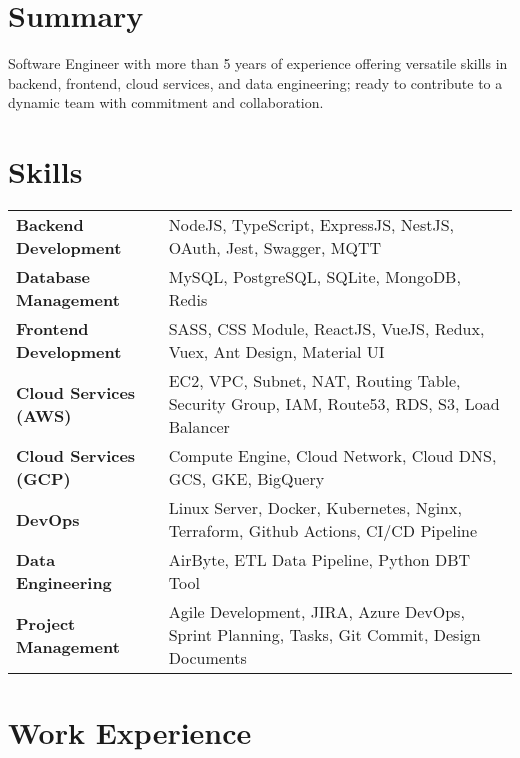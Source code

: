 \documentclass {article}
\begin{document}

\section{Summary}
Software Engineer with more than 5 years of experience offering versatile skills in backend, frontend, cloud services, and data engineering; ready to contribute to a dynamic team with commitment and collaboration.

\section{Skills}
\begin{tabularx}{\linewidth}{@{}l X@{}}
  \textbf{Backend Development} & NodeJS, TypeScript, ExpressJS, NestJS, OAuth, Jest, Swagger, MQTT\\
  \textbf{Database Management} & MySQL, PostgreSQL, SQLite, MongoDB, Redis\\ 
  \textbf{Frontend Development} & SASS, CSS Module, ReactJS, VueJS, Redux, Vuex, Ant Design, Material UI\\ 
  \textbf{Cloud Services (AWS)} & EC2, VPC, Subnet, NAT, Routing Table, Security Group, IAM, Route53, RDS, S3, Load Balancer\\ 
  \textbf{Cloud Services (GCP)} & Compute Engine, Cloud Network, Cloud DNS, GCS, GKE, BigQuery\\
  \textbf{DevOps} & Linux Server, Docker, Kubernetes, Nginx,  Terraform, Github Actions, CI/CD Pipeline\\
  \textbf{Data Engineering} & AirByte, ETL Data Pipeline, Python DBT Tool\\
  \textbf{Project Management} & Agile Development, JIRA, Azure DevOps, Sprint Planning, Tasks, Git Commit, Design Documents\\
\end{tabularx}

\section{Work Experience}
\end{document}
